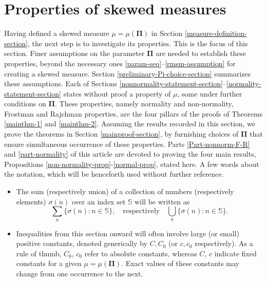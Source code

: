 \documentclass[12pt, twoside]{article}
\theoremstyle{definition}
\numberwithin{equation}{section}
\begin{document}
\section{Properties of skewed measures} \label{skewed-measure-properties-section} 
Having defined a skewed measure $\mu = \mu(\pmb{\Pi})$ in Section \ref{measure-definition-section}, the next step is to investigate its properties. This is the focus of this section.  
Finer assumptions on the parameter $\pmb{\Pi}$ are needed to establish these properties, beyond the necessary ones \eqref{param-seq}--\eqref{rmsm-assumption} for creating a skewed measure.
Section \ref{preliminary-Pi-choice-section} summarizes these assumptions. Each of Sections \ref{nonnormality-statement-section}--\ref{normality-statement-section} states without proof a property of $\mu$, some under further conditions on $\pmb{\Pi}$. These properties, namely normality and non-normality, Frostman and Rajchman properties, are the four pillars of the proofs of Theorems \ref{mainthm-1} and \ref{mainthm-2}. Assuming the results recorded in this section, we prove the theorems in Section \ref{mainproof-section}, by furnishing choices of $\pmb{\Pi}$ that ensure simultaneous occurrence of these properties. Parts \ref{Part-nonnorm-F-R} and \ref{part-normality} of this article are devoted to proving the four main results, Propositions \ref{non-normality-prop}-\ref{normal-prop}, stated here.    
\vskip0.1in 
\noindent A few words about the notation, which will be henceforth used without further reference.  
\begin{itemize}
\item The sum (respectively union) of a collection of numbers (respectively elements) $\sigma(n)$ over an index set $\mathbb S$ will be written as 
\[ \sum_n \bigl\{\sigma(n) : n \in \mathbb S \bigr\}, \quad \text{respectively} \quad \bigcup_n  \bigl\{\sigma(n) : n \in \mathbb S \bigr\}. \] 
\item Inequalities from this section onward will often involve large (or small) positive constants, denoted generically by $C, C_0$ (or $c, c_0$ respectively). As a rule of thumb, $C_0$, $c_0$ refer to absolute constants, whereas $C$, $c$  indicate fixed constants for a given $\mu=\mu(\pmb{\Pi})$. Exact values of these constants may change from one occurrence to the next.
\end{itemize}
\end{document}
